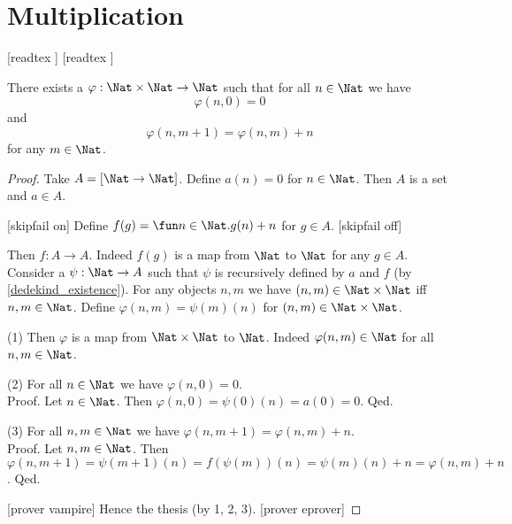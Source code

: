 \documentclass{article}
\begin{document}
  \section{Multiplication}\label{sec:multiplication}

  \begin{forthel}
    [readtex ]
    [readtex ]
  \end{forthel}

  \begin{forthel}
    \begin{lemma}\label{mul_existence}
      There exists a $\varphi : \Nat \times \Nat \to \Nat$ such
      that for all $n \in \Nat$ we have
      \[\varphi(n, 0) = 0\]
      and
      \[\varphi(n, m + 1) = \varphi(n,m) + n\]
      for any $m \in \Nat$.
    \end{lemma}
    \begin{proof}
      Take $A = [\Nat \to \Nat]$.
      Define $a(n) = 0$ for $n \in \Nat$.
      Then $A$ is a set and $a \in A$.

      [skipfail on] %
      Define $f(g) = \fun n \in \Nat. g(n) + n$ for $g \in A$.
      [skipfail off]

      Then $f : A \to A$.
      Indeed $f(g)$ is a map from $\Nat$ to $\Nat$ for any $g \in A$.
      Consider a $\psi : \Nat \to A$ such that $\psi$ is recursively defined by
      $a$ and $f$ (by \cref{dedekind_existence}).
      For any objects $n, m$ we have $(n,m) \in \Nat \times \Nat$ iff
      $n, m \in \Nat$.
      Define $\varphi(n,m) = \psi(m)(n)$ for $(n,m) \in \Nat \times \Nat$.

      (1) Then $\varphi$ is a map from $\Nat \times \Nat$ to $\Nat$.
      Indeed $\varphi(n,m) \in \Nat$ for all $n, m \in \Nat$.

      (2) For all $n \in \Nat$ we have $\varphi(n,0) = 0$. \\
      Proof.
        Let $n \in \Nat$.
        Then $\varphi(n,0)
          = \psi(0)(n)
          = a(0)
          = 0$.
      Qed.

      (3) For all $n, m \in \Nat$ we have $\varphi(n, m + 1) =
      \varphi(n,m) + n$. \\
      Proof.
        Let $n, m \in \Nat$.
        Then $\varphi(n, m + 1)
          = \psi(m + 1)(n)
          = f(\psi(m))(n)
          = \psi(m)(n) + n
          = \varphi(n,m) + n$.
      Qed.

      [prover vampire]
      Hence the thesis (by 1, 2, 3).
      [prover eprover]
    \end{proof}
  \end{forthel}
\end{document}

